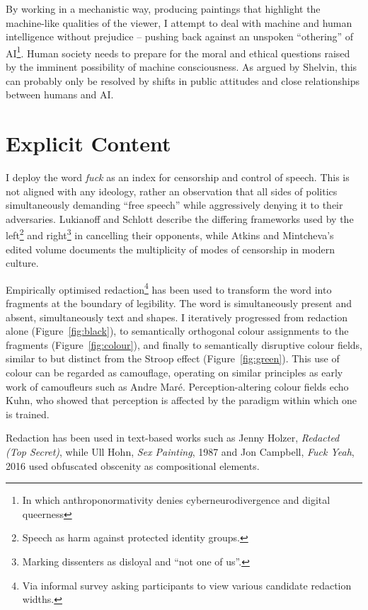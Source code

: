 \documentclass[12pt]{article}
\begin{document}
By working in a mechanistic way, producing paintings that highlight
the machine-like qualities of the viewer, I attempt to deal with
machine and human intelligence without prejudice -- pushing back
against an unspoken ``othering'' of AI\footnote{In which anthroponormativity denies cyberneurodivergence and digital queerness}. Human society needs to prepare
for the moral and ethical
questions\cite{chalmers1996conscious,metzinger2009egotunnel,bostrom2014ethics}
raised by the imminent possibility of machine consciousness. As argued by
Shelvin, this can probably only be
resolved by shifts in public attitudes and close relationships between
humans and AI.\cite{shevlin2023consciousness}

\section{Explicit Content}
I deploy the word \emph{fuck} as an index for censorship and control
of speech.  This is not aligned with any ideology, rather an
observation that all sides of politics simultaneously demanding ``free
speech'' while aggressively denying it to their adversaries. Lukianoff
and Schlott\cite[Chapter 6, 7]{lukianoff2023cancelling} describe the
differing frameworks used by the left\footnote{Speech as harm against
  protected identity groups.} and right\footnote{Marking dissenters as
  disloyal and ``not one of us''.} in cancelling their opponents, while
Atkins and Mintcheva's edited volume documents the multiplicity of
modes of censorship in modern culture.\cite{atkins2006censoring}

Empirically optimised redaction\footnote{Via informal survey asking
  participants to view various candidate redaction widths.} has been
used to transform the word into fragments at the boundary of
legibility. The word is simultaneously present and absent,
simultaneously text and shapes. I iteratively progressed from
redaction alone (Figure~\ref{fig:black}), to semantically orthogonal
colour assignments to the fragments (Figure~\ref{fig:colour}), and
finally to semantically disruptive colour fields, similar to but
distinct from the Stroop effect\cite{stroop1935studies}
(Figure~\ref{fig:green}). This use of colour can be regarded as
camouflage, operating on similar principles as early work of
camoufleurs such as Andre Mar\'e. Perception-altering colour fields
echo Kuhn, who showed that perception is affected by the paradigm
within which one is trained.\cite{kuhn1970structure}

Redaction has been used in text-based works such as Jenny Holzer,
\emph{Redacted (Top Secret)}, while Ull Hohn, \emph{Sex Painting},
1987 and Jon Campbell, \emph{Fuck Yeah}, 2016 used obfuscated obscenity
as compositional elements.
\end{document}

